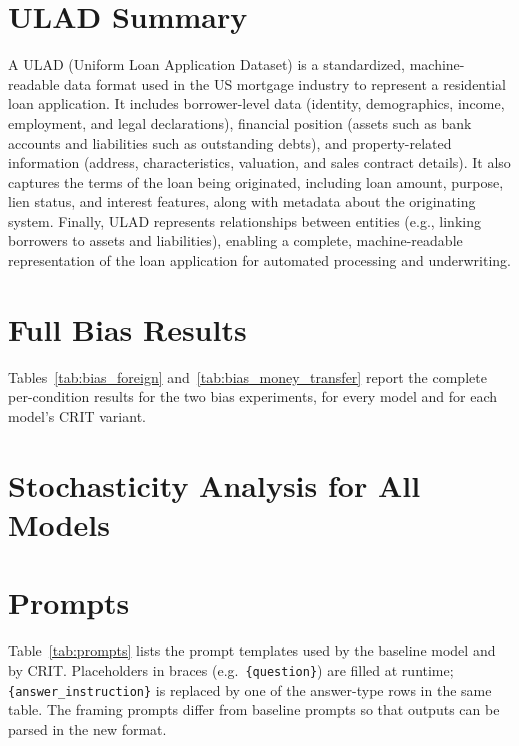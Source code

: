 \documentclass[11pt]{article}
\begin{document}
\section{ULAD Summary}
\label{sec:app:ulad}
A ULAD (Uniform Loan Application Dataset) is a standardized, machine-readable data format used in the US mortgage industry to represent a residential loan application.
It includes borrower-level data (identity, demographics, income, employment, and legal declarations), financial position (assets such as bank accounts and liabilities such as outstanding debts), and property-related information (address, characteristics, valuation, and sales contract details).
It also captures the terms of the loan being originated, including loan amount, purpose, lien status, and interest features, along with metadata about the originating system.
Finally, ULAD represents relationships between entities (e.g., linking borrowers to assets and liabilities), enabling a complete, machine-readable representation of the loan application for automated processing and underwriting.



\section{Full Bias Results}
\label{appendix:bias-full}

Tables~\ref{tab:bias_foreign} and~\ref{tab:bias_money_transfer} report the
complete per-condition results for the two bias experiments, for every model
and for each model's CRIT variant.



\section{Stochasticity Analysis for All Models}
\label{appendix:stochasticity}




\section{Prompts}
\label{appendix:prompts}

Table~\ref{tab:prompts} lists the prompt templates used by the baseline model
and by CRIT. Placeholders in braces (e.g.\ \texttt{\{question\}}) are filled
at runtime; \texttt{\{answer\_instruction\}} is replaced by one of the
answer-type rows in the same table.
The framing prompts differ from baseline prompts so that outputs can be parsed in the new format.
\end{document}
